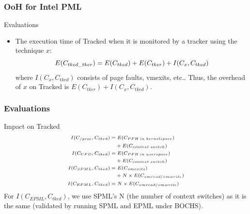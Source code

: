 \documentclass[xcolor=table,bigger,unknownkeysallowed]{beamer}
\begin{document}
        \begin{frame}
                \frametitle{OoH for Intel PML}			
			\begin{block}{Evaluations}
				\begin{itemize}
					\item The execution time of Tracked when it is monitored by a tracker using the technique $x$:
	\begin{equation}
		\small
		\label{eq:formula-tracked}
		E(C_{tked\_tker}) = E(C_{tked}) + E(C_{tker}) + I(C_{x},C_{tked})
	\end{equation}
	where $I(C_{x},C_{tked})$ consists of page faults, vmexits, etc..
	Thus, the overhead of $x$ on Tracked is $E(C_{tker}) + I(C_{x},C_{tked})$. 
				\end{itemize}
			\end{block} 
        \end{frame}        
        \begin{frame}
                \frametitle{Evaluations}
				\begin{block}{Impact on Tracked}
	\begin{equation}\scriptsize
		\begin{split}
			I(C_{/proc},C_{tked}) = & \; E(C_{PFH \; in \; kernelspace})\\
									& + E(C_{context \; switch})\\
			I(C_{UFD},C_{tked}) = & \; E(C_{PFH \; in \; userspace})\\
								& + E(C_{context \; switch}) \\
			I(C_{SPML},C_{tked}) = & \; E(C_{vmexits}) \\
								& + N \times E(C_{vmread/vmwrite})\\
			I(C_{EPML},C_{tked}) = & \; N \times E(C_{vmread/vmwrite})	
		\end{split}
		\label{eq:formula-impact-detailed}
	\end{equation}		
For $I(C_{EPML},C_{tked})$, we use SPML's N (the number of context switches) as it is the same (validated by running SPML and EPML under BOCHS).
			\end{block}
        \end{frame}   
\end{document}
